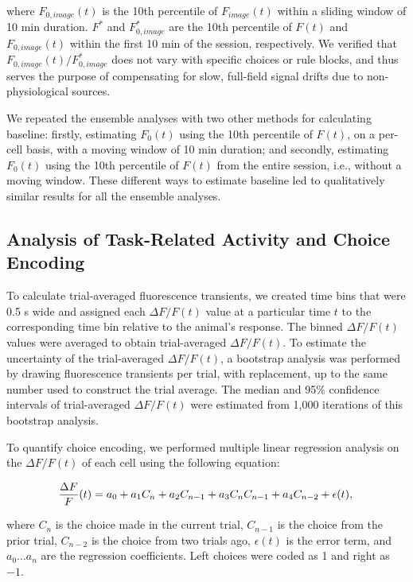 \noindent where $F_{0,image}(t)$ is the 10th percentile of $F_{image}(t)$ within a sliding window of 10 min duration. $F^*$ and $F^*_{0,image}$ are the 10th percentile of $F(t)$ and $F_{0,image}(t)$ within the first 10 min of the session, respectively. We verified that $F_{0,image}(t)/F^*_{0,image}$ does not vary with specific choices or rule blocks, and thus serves the purpose of compensating for slow, full-field signal drifts due to non-physiological sources. 

We repeated the ensemble analyses with two other methods for calculating baseline: firstly, estimating $F_0(t)$ using the 10th percentile of $F(t)$, on a per-cell basis, with a moving window of 10 min duration; and secondly, estimating $F_0(t)$ using the 10th percentile of $F(t)$ from the entire session, i.e., without a moving window. These different ways to estimate baseline led to qualitatively similar results for all the ensemble analyses.

\subsection*{Analysis of Task-Related Activity and Choice Encoding}
To calculate trial-averaged fluorescence transients, we created time bins that were 0.5 s wide and assigned each $\Delta F/F (t)$ value at a particular time $t$ to the corresponding time bin relative to the animal's response. The binned $\Delta F/F (t)$ values were averaged to obtain trial-averaged $\Delta F/F (t)$. To estimate the uncertainty of the trial-averaged $\Delta F/F (t)$, a bootstrap analysis was performed by drawing fluorescence transients per trial, with replacement, up to the same number used to construct the trial average. The median and 95\% confidence intervals of trial-averaged $\Delta F/F (t)$ were estimated from 1,000 iterations of this bootstrap analysis. 

To quantify choice encoding, we performed multiple linear regression analysis on the $\Delta F/F (t)$ of each cell using the following equation:

\begin{equation*}
\frac{\Delta F}{F}(t) = a_0 + a_1 C_{n} + a_2 C_{n-1} + a_3 C_{n} C_{n-1} + a_4 C_{n-2} + \epsilon(t),\\
\end{equation*}

\noindent where $C_n$ is the choice made in the current trial, $C_{n-1}$ is the choice from the prior trial, $C_{n-2}$ is the choice from two trials ago, $\epsilon (t)$ is the error term, and $a_0 \ldots a_n$ are the regression coefficients. Left choices were coded as 1 and right as $-1$. 

